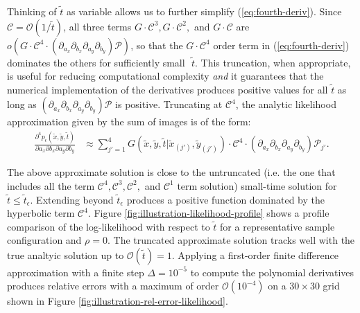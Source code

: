 Thinking of $\tilde{t}$ as variable allows us to further simplify
(\ref{eq:fourth-deriv}). Since
$\mathcal{C} = \mathcal{O}(1/\tilde{t})$, all three terms
$G\cdot \mathcal{C}^3, G\cdot \mathcal{C}^2,$ and $G\cdot \mathcal{C}$
are
$o\left( G\cdot \mathcal{C}^4 \cdot \left(\partial_{a_x}\partial_{b_x}
    \partial_{a_y}\partial_{b_y} \right)\mathcal{P} \right)$, so that
the $G\cdot \mathcal{C}^4$ order term in (\ref{eq:fourth-deriv})
dominates the others for sufficiently small $\,\,\tilde{t}$. This
truncation, when appropriate, is useful for reducing computational
complexity \textit{and} it guarantees that the numerical
implementation of the derivatives produces positive values for all
$\tilde{t}$ as long as
$\left(\partial_{a_x}\partial_{b_x} \partial_{a_y}\partial_{b_y}
\right)\mathcal{P}$ is positive. Truncating at $\mathcal{C}^4$, the
analytic likelihood approximation given by the sum of images is of the
form:
\begin{align}
  \frac{\partial^4 p_\epsilon(\tilde{x}, \tilde{y}, \tilde{t})}{\partial a_x
  \partial b_x \partial a_y \partial b_y} &\approx \sum_{j'=1}^{4} G(\tilde{x},\tilde{y},\tilde{t}|\tilde{x}_{(j')},\tilde{y}_{(j')}) \cdot \mathcal{C}^4 \cdot \left(\partial_{a_x}\partial_{b_x} \partial_{a_y}\partial_{b_y} \right)\mathcal{P}_{j'}. \label{eq:truncated-approx}
\end{align}

The above approximate solution is close to the untruncated (i.e. the
one that includes all the term
$\mathcal{C}^4, \mathcal{C}^3, \mathcal{C}^2,$ and $\mathcal{C}^1$
term solution) small-time solution for
$\tilde{t} \leq \tilde{t}_\epsilon$. Extending beyond
$\tilde{t}_\epsilon$ produces a positive function dominated by the
hyperbolic term $\mathcal{C}^4$. Figure
\ref{fig:illustration-likelihood-profile} shows a profile comparison
of the log-likelihood with respect to $\tilde{t}$ for a representative
sample configuration and $\rho=0$. The truncated approximate solution
tracks well with the true analtyic solution up to
$\mathcal{O}(\tilde{t}) = 1$. Applying a first-order finite difference
approximation with a finite step $\Delta = 10^{-5}$ to compute the
polynomial derivatives produces relative errors with a maximum of
order $\mathcal{O}(10^{-4})$ on a $30 \times 30$ grid shown in Figure
\ref{fig:illustration-rel-error-likelihood}.






